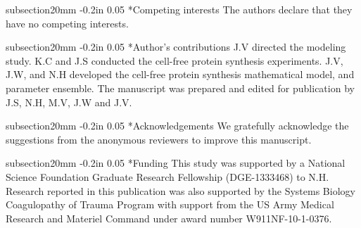 \documentclass[12pt]{article}
\makeatletter
\renewcommand\section{\@startsection
	{subsection}{2}{0mm}
	{-0.2in}
	{0.05\baselineskip}
	{\normalfont\large\bfseries}}
\makeatother
\begin{document}
\clearpage

\section*{Competing interests}
The authors declare that they have no competing interests.

\section*{Author's contributions}
J.V directed the modeling study.
K.C and J.S conducted the cell-free protein synthesis experiments.
J.V, J.W, and N.H developed the cell-free protein synthesis mathematical model, and parameter ensemble.
The manuscript was prepared and edited for publication by J.S, N.H, M.V, J.W and J.V.

\section*{Acknowledgements}
We gratefully acknowledge the suggestions from the anonymous reviewers to improve this manuscript.

\section*{Funding}
This study was supported by a National Science Foundation Graduate Research Fellowship (DGE-1333468) to N.H.
Research reported in this publication was also supported by the Systems Biology Coagulopathy of Trauma Program
with support from the US Army Medical Research and Materiel Command under award number W911NF-10-1-0376.

\clearpage



\clearpage

\end{document}
